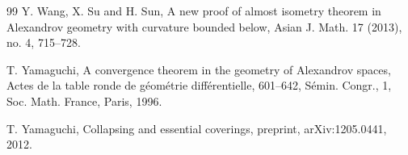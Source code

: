 \documentclass[a4paper,12pt]{amsart}
\theoremstyle{plain}
\theoremstyle{definition}
\numberwithin{thm}{section}
\numberwithin{equation}{section}
\begin{document}
\begin{thebibliography}{99}
Y. Wang, X. Su and H. Sun, A new proof of almost isometry theorem in Alexandrov geometry with curvature bounded below, Asian J. Math. 17 (2013), no. 4, 715--728.

T. Yamaguchi, A convergence theorem in the geometry of Alexandrov spaces, Actes de la table ronde de g\'eom\'etrie diff\'erentielle, 601--642, S\'emin. Congr., 1, Soc. Math. France, Paris, 1996.

T. Yamaguchi, Collapsing and essential coverings, preprint, arXiv:1205.0441, 2012.

\end{thebibliography}
\end{document}

